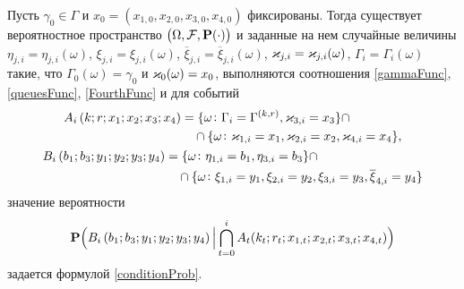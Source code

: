 \documentclass[a4paper,12pt,russian]{extarticle}
\newcommand{\G}{\Gamma}
\newcommand{\ga}[1]{\Gamma^{\left( #1 \right)} }
\renewcommand{\Pr}{{\mathbf P}}
\begin{document}
\begin{theorem}
Пусть $\gamma_0 \in \G$ и $x_0=(x_{1,0},x_{2,0}, x_{3,0},x_{4,0})$ фиксированы.
Тогда существует вероятностное пространство $\br{\Omega, {\cal F}, \Pr(\cdot)}$ и заданные на нем случайные величины $\eta_{j,i}=\eta_{j,i}(\omega)$, $\xi_{j,i}=\xi_{j,i}(\omega)$, $\overline{\xi}_{j,i}=\overline{\xi}_{j,i}(\omega)$,  $\varkappa_{j,i}=\varkappa_{j,i}(\omega)$, $\G_i=\G_i(\omega)$ такие, что $\G_0(\omega) = \gamma_0$ и $\varkappa_0(\omega)=x_0$, выполняются соотношения \eqref{gammaFunc}, \eqref{queuesFunc}, \eqref{FourthFunc} и для событий 
\begin{gather}
\begin{aligned}
A_i\br{k;r;x_1;x_2;x_3;x_4} &= \{\omega \colon\G_i=\ga{k,r},\vk_{3,i}=x_3\}\cap\\ 
& \quad \cap \{\omega \colon \vk_{1,i}=x_1,\vk_{2,i}=x_2,\vk_{4,i}=x_4\},
\end{aligned}\\
\begin{aligned}
B_i\br{b_1;b_3;y_1;y_2;y_3;y_4} &= \{\omega \colon \eta_{1,i}=b_1,\eta_{3,i}=b_3\} \cap \\
&\quad \cap \{\omega \colon \xi_{1,i}=y_1,\xi_{2,i}=y_2,\xi_{3,i}=y_3,\overline{\xi}_{4,i}=y_4\}
\end{aligned}
\end{gather}
значение вероятности
\begin{equation*}
\Pr \Bigl(B_i\br{b_1;b_3;y_1;y_2;y_3;y_4}\Big|\bigcap_{t=0}^{i} A_t(k_t;r_t;x_{1,t};x_{2,t};x_{3,t};x_{4,t})\Bigr)
\end{equation*}
задается формулой \eqref{conditionProb}.
\end{theorem}
\end{document}
